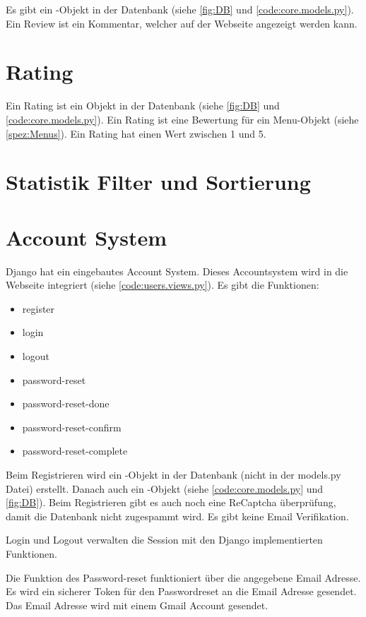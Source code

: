 Es gibt ein -Objekt in der Datenbank (siehe \ref{fig:DB} und
\ref{code:core.models.py}). Ein Review ist ein Kommentar, welcher auf der
Webseite angezeigt werden kann.

\section{Rating} \label{spez:Rating}

Ein Rating ist ein Objekt in der Datenbank (siehe \ref{fig:DB} und
\ref{code:core.models.py}). Ein Rating ist eine Bewertung für ein Menu-Objekt
(siehe \ref{spez:Menus}). Ein Rating hat einen Wert zwischen 1 und 5.

\section{Statistik Filter und Sortierung} \label{spez:Statistik}



\section{Account System} \label{spez:Account}

Django hat ein eingebautes Account System. Dieses Accountsystem wird in die
Webseite integriert (siehe \ref{code:users.views.py}). Es gibt die Funktionen:
\begin{itemize}
    \item register
    \item login
    \item logout
    \item password-reset
    \item password-reset-done
    \item password-reset-confirm
    \item password-reset-complete
\end{itemize}

Beim Registrieren wird ein -Objekt in der Datenbank (nicht in der
models.py Datei) erstellt. Danach auch ein -Objekt (siehe
\ref{code:core.models.py} und \ref{fig:DB}). Beim Registrieren gibt es auch noch
eine ReCaptcha überprüfung, damit die Datenbank nicht zugespammt wird. Es gibt
keine Email Verifikation.

Login und Logout verwalten die Session mit den Django implementierten
Funktionen.

Die Funktion des Password-reset funktioniert über die angegebene Email Adresse.
Es wird ein sicherer Token für den Passwordreset an die Email Adresse gesendet.
Das Email Adresse wird mit einem Gmail Account gesendet.

